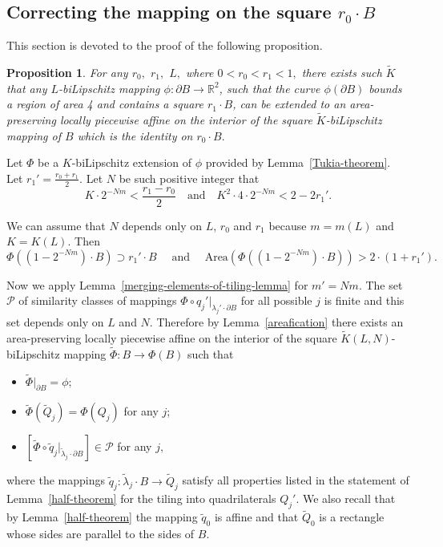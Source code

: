 \documentclass[12pt]{article}
\newtheorem{prop}{Proposition}[section]
\theoremstyle{definition}
\begin{document}
\subsection{Correcting the mapping on the square $r_0\cdot B$}
\label{correction-on-some-square}

This section is devoted to the proof of the following proposition.

\begin{prop}
\label{extension-to-annulus-lemma}
For any $r_0,$ $r_1,$ $L,$ where $0<r_0<r_1<1,$ there exists such $\widetilde K$ that any $L$-biLipschitz mapping $\phi:\partial B\to\mathbb R^2$, such that the curve $\phi(\partial B)$ bounds a region of area 4 and contains a square $r_1\cdot B$, can be extended to an area-preserving locally piecewise affine on the interior of the square $\widetilde K$-biLipschitz mapping of $B$ which is the identity on $r_0\cdot B.$
\end{prop}

Let $\Phi$ be a $K$-biLipschitz extension of $\phi$ provided by Lemma~\ref{Tukia-theorem}.
Let $r_1' = \frac{r_0+r_1}2.$ Let $N$ be such positive integer that
$$
K\cdot 2^{-Nm} < \frac{r_1-r_0}2
\quad\text{and}\quad
K^2\cdot 4\cdot 2^{-Nm} < 2 - 2r_1'.
$$

We can assume that $N$ depends only on $L$, $r_0$ and $r_1$ because $m = m(L)$ and $K = K(L).$ Then
$$
\Phi\left(\left(1-2^{-Nm}\right)\cdot B\right)\supset r_1'\cdot B 
\quad
\text{ and }
\quad
\mathrm{Area}\left(\Phi\left(\left(1-2^{-Nm}\right)\cdot B\right)\right) > 2\cdot (1+r_1').
$$

Now we apply Lemma~\ref{merging-elements-of-tiling-lemma} for $m'=Nm.$ The set $\mathcal P$ of similarity classes of mappings $\Phi\circ q_j'\big|_{\lambda_j'\cdot\partial B}$ for all possible $j$ is finite and this set depends only on $L$ and $N.$ Therefore by Lemma~\ref{areafication} there exists an area-preserving locally piecewise affine on the interior of the square $\widetilde K(L,N)$-biLipschitz mapping $\widetilde\Phi:B\to\Phi(B)$ such that
\begin{itemize}
\item
$\widetilde\Phi\big|_{\partial B} = \phi;$
\item
$\widetilde\Phi\left(\widetilde Q_j\right) = \Phi(Q_j)$ for any $j$;
\item
$\left[\widetilde\Phi\circ \widetilde q_j\big|_{\widetilde\lambda_j\cdot \partial B}\right]\in\mathcal P$ for any $j,$
\end{itemize}
where the mappings $\widetilde q_j:\widetilde\lambda_j\cdot B\to\widetilde Q_j$ satisfy all properties listed in the statement of Lemma~\ref{half-theorem} for the tiling into quadrilaterals $Q_j'.$ We also recall that by Lemma~\ref{half-theorem} the mapping $\widetilde q_0$ is affine and that $\widetilde Q_0$ is a rectangle whose sides are parallel to the sides of $B.$
\end{document}

